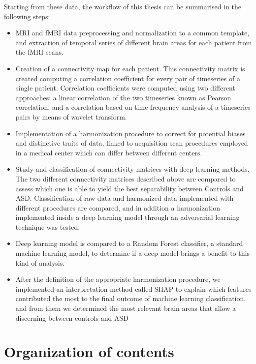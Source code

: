 \documentclass[11pt]{report}
\begin{document}
Starting from these data, the workflow of this thesis can be summarised in the following steps:

\begin{itemize}
\item MRI and fMRI data preprocessing and normalization to a common template, and extraction of temporal series of different brain areas for each patient from the fMRI scans.
\item Creation of a connectivity map for each patient. This connectivity matrix is created computing a correlation coefficient for every pair of timeseries of a single patient. Correlation coefficients were computed using two different approaches: a linear correlation of the two timeseries known as Pearson correlation, and a correlation based on time-frequency analysis of a timeseries pairs by means of wavelet transform.
\item Implementation of a harmonization procedure to correct for potential biases and distinctive traits of data, linked to acquisition scan procedures employed in a medical center which can differ between different centers.
\item Study and classification of connectivity matrices with deep learning methods. The two different connectivity matrices described above are compared to assess which one is able to yield the best separability between Controls and ASD.
Classification of raw data and harmonized data implemented with different procedures are compared, and in addition a harmonization implemented inside a deep learning model through an adversarial learning technique was tested.
\item Deep learning model is compared to a Random Forest classifier, a standard machine learning model, to determine if a deep model brings a benefit to this kind of analysis.
\item After the definition of the appropriate harmonization procedure, we implemented an interpretation method called SHAP to explain which features contributed the most to the final outcome of machine learning classification, and from them we determined the most relevant brain areas that allow a discerning between controls and ASD
\end{itemize}

\chapter*{Organization of contents}
\end{document}
